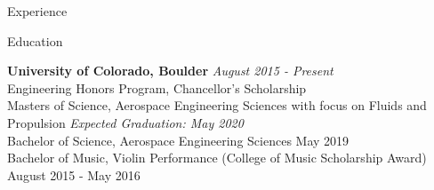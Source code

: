 \documentclass{resume} %
\begin{document}
\begin{rSection}{Experience}


\end{rSection}







\begin{rSection}{Education}

{\bf University of Colorado, Boulder} \hfill {\em August 2015 - Present} \\ 
{\small Engineering Honors Program, Chancellor's Scholarship\\
Masters of Science, Aerospace Engineering Sciences with focus on Fluids and Propulsion \hfill \textit{Expected Graduation: May 2020} \\
Bachelor of Science, Aerospace Engineering Sciences \hfill  May 2019 \\
Bachelor of Music, Violin Performance (College of Music Scholarship Award) \hfill August 2015 - May 2016 
} 

\end{rSection}

\end{document}
